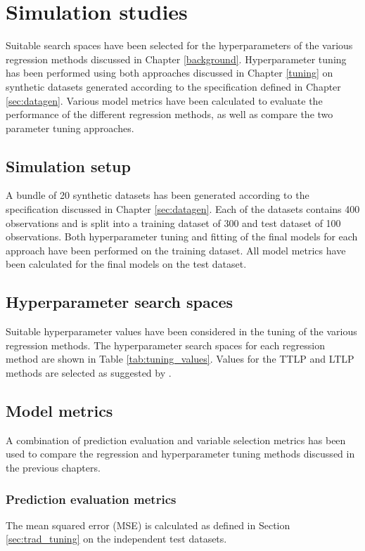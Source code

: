 \chapter{Simulation studies}
Suitable search spaces have been selected for the hyperparameters of the various regression methods discussed in Chapter \ref{background}. Hyperparameter tuning has been performed using both approaches discussed in Chapter \ref{tuning} on synthetic datasets generated according to the specification defined in Chapter \ref{sec:datagen}. Various model metrics have been calculated to evaluate the performance of the different regression methods, as well as compare the two parameter tuning approaches.

\section{Simulation setup}
A bundle of 20 synthetic datasets has been generated according to the specification discussed in Chapter \ref{sec:datagen}. Each of the datasets contains 400 observations and is split into a training dataset of 300 and test dataset of 100 observations. Both hyperparameter tuning and fitting of the final models for each approach have been performed on the training dataset. All model metrics have been calculated for the final models on the test dataset.

\section{Hyperparameter search spaces}
Suitable hyperparameter values have been considered in the tuning of the various regression methods. The hyperparameter search spaces for each regression method are shown in Table \ref{tab:tuning_values}. Values for the TTLP and LTLP methods are selected as suggested by \cite{kim2013network}.


\section{Model metrics}
A combination of prediction evaluation and variable selection metrics has been used to compare the regression and hyperparameter tuning methods discussed in the previous chapters.

\subsection{Prediction evaluation metrics}
The mean squared error (MSE) is calculated as defined in Section \ref{sec:trad_tuning} on the independent test datasets. 

